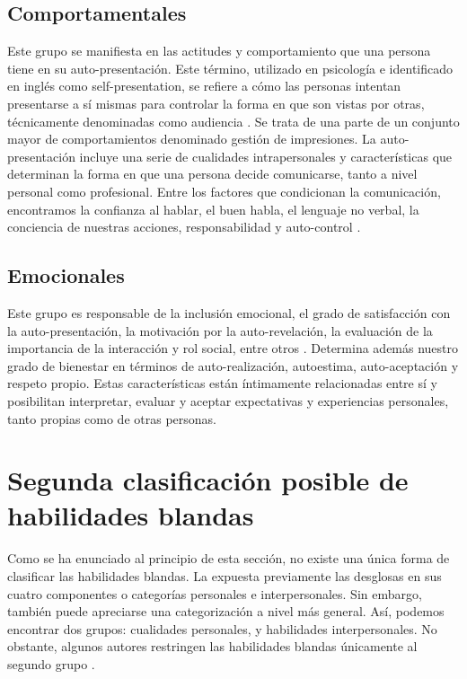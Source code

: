 \documentclass[conference]{IEEEtran}
\begin{document}
\subsection{Comportamentales}
\label{scrivauto:7}

Este grupo se manifiesta en las actitudes y comportamiento que una persona tiene en su auto-presentación. Este término, utilizado en psicología e identificado en inglés como self-presentation, se refiere a cómo las personas intentan presentarse a sí mismas para controlar la forma en que son vistas por otras, técnicamente denominadas como audiencia \cite{b8}. Se trata de una parte de un conjunto mayor de comportamientos denominado gestión de impresiones.
La auto-presentación incluye una serie de cualidades intrapersonales y características que determinan la forma en que una persona decide comunicarse, tanto a nivel personal como profesional. Entre los factores que condicionan la comunicación, encontramos la confianza al hablar, el buen habla, el lenguaje no verbal, la conciencia de nuestras acciones, responsabilidad y auto-control \cite{b7}.



\subsection{Emocionales}
\label{scrivauto:8}

Este grupo es responsable de la inclusión emocional, el grado de satisfacción con la auto-presentación, la motivación por la auto-revelación, la evaluación de la importancia de la interacción y rol social, entre otros \cite{b7}. Determina además nuestro grado de bienestar en términos de auto-realización, autoestima, auto-aceptación y respeto propio. Estas características están íntimamente relacionadas entre sí y posibilitan interpretar, evaluar y aceptar expectativas y experiencias personales, tanto propias como de otras personas.


\section{Segunda clasificación posible de habilidades blandas}
\label{scrivauto:9}

Como se ha enunciado al principio de esta sección, no existe una única forma de clasificar las habilidades blandas. La expuesta previamente las desglosas en sus cuatro componentes o categorías personales e interpersonales. Sin embargo, también puede apreciarse una categorización a nivel más general. Así, podemos encontrar dos grupos: cualidades personales, y habilidades interpersonales. No obstante, algunos autores restringen las habilidades blandas únicamente al segundo grupo \cite{b3}.
\end{document}
